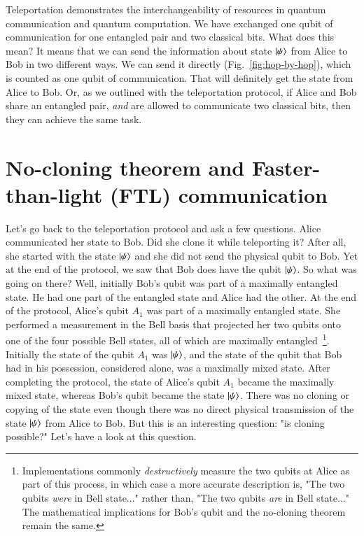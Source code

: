 Teleportation demonstrates the interchangeability of resources in quantum communication and quantum computation. We have exchanged one qubit of communication for one entangled pair and two classical bits. What does this mean? It means that we can send the information about state $\left| \psi \right\rangle$ from Alice to Bob in two different ways. We can send it directly (Fig.~\ref{fig:hop-by-hop}), which is counted as one qubit of communication. That will definitely get the state from Alice to Bob. Or, as we outlined with the teleportation protocol, if Alice and Bob share an entangled pair, \emph{and} are allowed to communicate two classical bits, then they can achieve the same task.

\section{No-cloning theorem and Faster-than-light (FTL) communication}
\label{sec:8-3_no-cloning}

Let's go back to the teleportation protocol and ask a few questions. Alice communicated her state to Bob. Did she clone it while teleporting it? After all, she started with the state $\left| \psi \right\rangle$ and she did not send the physical qubit to Bob. Yet at the end of the protocol, we saw that Bob does have the qubit $\left| \psi \right\rangle$. So what was going on there? Well, initially Bob's qubit was part of a maximally entangled state. He had one part of the entangled state and Alice had the other. At the end of the protocol, Alice's qubit $A_1$ was part of a maximally entangled state. She performed a measurement in the Bell basis that projected her two qubits onto one of the four possible Bell states, all of which are maximally entangled~\footnote{Implementations commonly \emph{destructively} measure the two qubits at Alice as part of this process, in which case a more accurate description is, "The two qubits \emph{were} in Bell state..." rather than, "The two qubits \emph{are} in Bell state..." The mathematical implications for Bob's qubit and the no-cloning theorem remain the same.}. Initially the state of the qubit $A_1$ was $\left| \psi \right\rangle$, and the state of the qubit that Bob had in his possession, considered alone, was a maximally mixed state. After completing the protocol, the state of Alice's qubit $A_1$ became the maximally mixed state, whereas Bob's qubit became the state $\left| \psi \right\rangle$. There was no cloning or copying of the state even though there was no direct physical transmission of the state $\left| \psi \right\rangle$ from Alice to Bob. But this is an interesting question: "is cloning possible?"  Let's have a look at this question.


